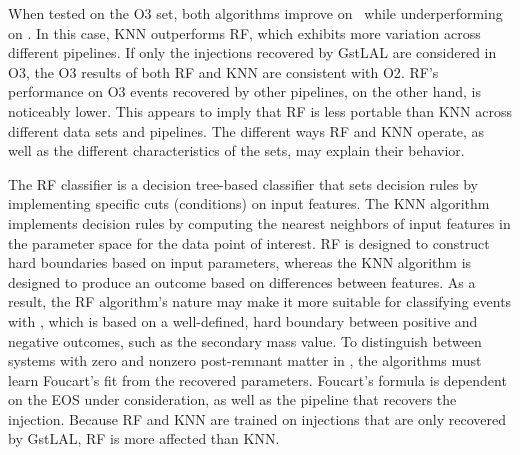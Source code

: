  When tested on the \ac{O3} set, both algorithms improve on \hasns\ while underperforming on
\hasrem.  In this case, \ac{KNN} outperforms \ac{RF}, which exhibits more variation across different pipelines.  If only the injections recovered by GstLAL are considered in \ac{O3}, the
\ac{O3} results of both \ac{RF} and \ac{KNN} are consistent with \ac{O2}. \ac{RF}'s performance on \ac{O3} events recovered by other pipelines, on the other hand, is noticeably lower.
This appears to imply that \ac{RF} is less portable than \ac{KNN} across different data sets and pipelines. The different ways \ac{RF} and \ac{KNN} operate, as well as the different
characteristics of the sets, may explain their behavior.

The RF classifier is a decision tree-based classifier that sets decision rules by implementing specific cuts (conditions) on input features. The \ac{KNN} algorithm implements decision
rules by computing the nearest neighbors of input features in the parameter space for the data point of interest. \ac{RF} is designed to construct hard boundaries based on input
parameters, whereas the \ac{KNN} algorithm is designed to produce an outcome based on differences between features. As a result, the \ac{RF} algorithm's nature may make it more suitable
for classifying events with \hasns, which is based on a well-defined, hard boundary between positive and negative outcomes, such as the secondary mass value. To distinguish between
systems with zero and nonzero post-remnant matter in \hasrem, the algorithms must learn Foucart's fit from the recovered parameters. Foucart's formula is dependent on the \ac{EOS} under
consideration, as well as the pipeline that recovers the injection. Because \ac{RF} and \ac{KNN} are trained on injections that are only recovered by GstLAL, \ac{RF} is more affected than
\ac{KNN}. 

